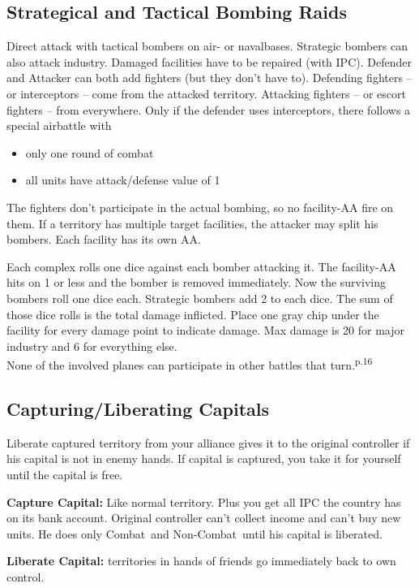 \documentclass[10pt,twoside]{article}
\begin{document}
\begin{multicols*}{3}
\subsection*{Strategical and Tactical Bombing Raids}
Direct attack with tactical bombers on air- or navalbases. Strategic bombers can also attack industry.
Damaged facilities have to be repaired (with IPC). Defender and Attacker can both add fighters (but they don't have to). Defending fighters -- or interceptors -- come from the attacked territory. Attacking fighters -- or escort fighters -- from everywhere. Only if the defender uses interceptors, there follows a special airbattle with
\begin{itemize}
\item only one round of combat
\item all units have attack/defense value of 1
\end{itemize}
The fighters don't participate in the actual bombing, so no facility-AA fire on them. If a territory has multiple target facilities, the attacker may split his bombers. Each facility has its own AA.

Each complex rolls one dice against each bomber attacking it. The facility-AA hits on 1 or less and the bomber is removed immediately. Now the surviving bombers roll one dice each. Strategic bombers add 2 to each dice. The sum of those dice rolls is the total damage inflicted. Place one gray chip under the facility for every damage point to indicate damage. Max damage is 20 for major industry and 6 for everything else.\\
None of the involved planes can participate in other battles that turn.\textsuperscript{p.16}

\subsection*{Capturing/Liberating Capitals}
Liberate captured territory from your alliance gives it to the original controller if his capital is not in enemy hands. If capital is captured, you take it for yourself until the capital is free.

\textbf{Capture Capital:} Like normal territory. Plus you get all IPC the country has on its bank account. Original controller can't collect income and can't buy new units. He does only \glqq Combat\grqq\ and \glqq Non-Combat\grqq\ until his capital is liberated.

\textbf{Liberate Capital:} territories in hands of friends go immediately back to own control.


\end{multicols*}
\end{document}
